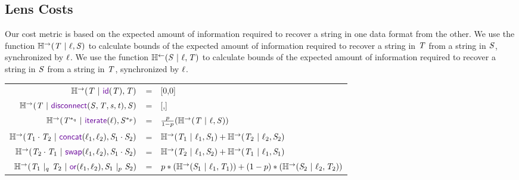 \documentclass[acmsmall,screen,anonymous]{acmart}
\begin{document}
\subsection{Lens Costs}
Our cost metric is based on the expected amount of information required to
recover a string in one data format from the other. We use the function
$\mathbb{H}^\rightarrow(\mathit{T} ~|~ \mathit{\ell}, \mathit{S})$ to calculate bounds of the
expected amount of information required to recover a string in $\mathit{T}$ from
a string in $\mathit{S}$, synchronized by $\mathit{\ell}$. We use the function
$\mathbb{H}^\leftarrow(\mathit{S} ~|~ \mathit{\ell}, \mathit{T})$ to calculate bounds of the
expected amount of information required to recover a string in $\mathit{S}$ from a
string in $\mathit{T}$, synchronized by $\mathit{\ell}$.
\begin{center}
  \begin{tabular}{rcl}
    $\REntropyOf{\RegexAlt \Given \IdentityLensOf{\RegexAlt}, \RegexAlt}$
    & =
    & [0,0]\\
    
    $\REntropyOf{\RegexAlt \Given \DisconnectOf{\Regex}{\RegexAlt}{\String}{\StringAlt}, \Regex}$
    & =
    & [\EntropyOf{\RegexAlt},\EntropyOf{\RegexAlt}]\\

    $\REntropyOf{\PRegexStar{\RegexAlt}{\ProbabilityAlt} \Given \IterateLensOf{\Lens}, \PRegexStar{\Regex}{\Probability}}$
    & =
    & $\frac{p}{1-p}(\mathbb{H}^\rightarrow(\mathit{T} ~|~ \mathit{\ell}, \mathit{S}))$\\
    
    $\REntropyOf{\RegexAlt_1 \Concat \RegexAlt_2 \Given \ConcatLensOf{\Lens_1}{\Lens_2}, \Regex_1 \Concat \Regex_2}$
    & =
    & $\mathbb{H}^\rightarrow(\mathit{T}_1 ~|~ \mathit{\ell}_1, \mathit{S}_1) + \mathbb{H}^\rightarrow(\mathit{T}_2 ~|~ \mathit{\ell}_2, \mathit{S}_2)$\\
    
    $\REntropyOf{\RegexAlt_2 \Concat \RegexAlt_1 \Given \SwapLensOf{\Lens_1}{\Lens_2}, \Regex_1 \Concat \Regex_2}$
    & =
    & $\mathbb{H}^\rightarrow(\mathit{T}_2 ~|~ \mathit{\ell}_1, \mathit{S}_2) + \mathbb{H}^\rightarrow(\mathit{T}_1 ~|~ \mathit{\ell}_1, \mathit{S}_1)$\\
    
    $\REntropyOf{\PRegexOr{\RegexAlt_1}{\RegexAlt_2}{\ProbabilityAlt} \Given \OrLensOf{\Lens_1}{\Lens_2}, \PRegexOr{\Regex_1}{\Regex_2}{\Probability}}$
    & =
    & $p*(\mathbb{H}^\rightarrow(\mathit{S}_1 ~|~ \mathit{\ell}_1, \mathit{T}_1) ) + (1-p)*(\mathbb{H}^\rightarrow(\mathit{S}_2 ~|~ \mathit{\ell}_2, \mathit{T}_2))$\\
    

\end{tabular}
\end{center}
\end{document}

